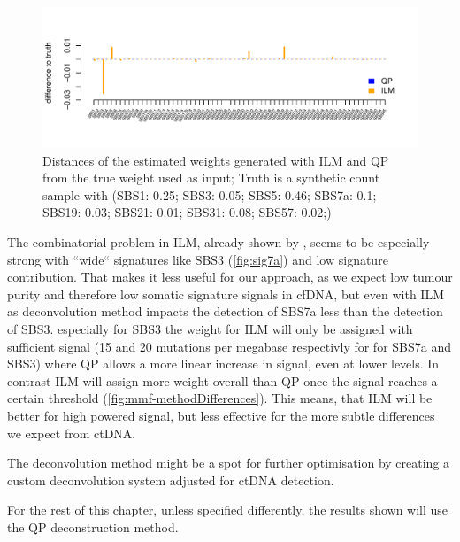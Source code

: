 \begin{figure}[!ht]
\centering
\includegraphics[width=.99\linewidth]{Figures/lowInputSignalDeconv.pdf}
\caption[Distance of deconvolution methods from truth]{Distances of the estimated weights generated with ILM and QP from the true weight used as input; Truth is a synthetic count sample with (SBS1: 0.25; SBS3: 0.05; SBS5: 0.46; SBS7a: 0.1; SBS19: 0.03; SBS21: 0.01; SBS31: 0.08; SBS57: 0.02;)}\label{fig:mmf-ILMerror}
\end{figure}
 
The combinatorial problem in ILM, already shown by \textcite{Lynch2016}, seems to be especially strong with ``wide`` signatures like SBS3 (\autoref{fig:sig7a}) and low signature contribution. That makes it less useful for our approach, as we expect low tumour purity and therefore low somatic signature signals in cfDNA, but even with ILM as deconvolution method impacts the detection of SBS7a less than the detection of SBS3. especially for SBS3 the weight for ILM will only be assigned with sufficient signal (15 and 20 mutations per megabase respectivly for for SBS7a and SBS3) where QP allows a more linear increase in signal, even at lower levels. In contrast ILM will assign more weight overall than QP once the signal reaches a certain threshold (\autoref{fig:mmf-methodDifferences}). This means, that ILM will be better for high powered signal, but less effective for the more subtle differences we expect from ctDNA.

The deconvolution method might be a spot for further optimisation by creating a custom deconvolution system adjusted for ctDNA detection.

For the rest of this chapter, unless specified differently, the results shown will use the QP deconstruction method.

